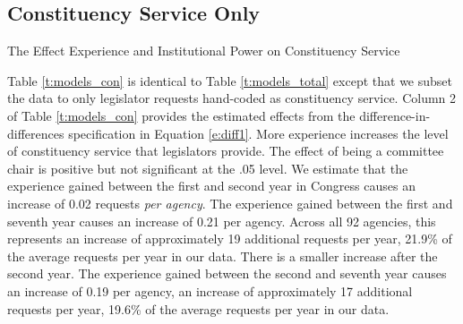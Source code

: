  




\subsection{Constituency Service Only}

\begin{table}[hbt!]
\caption{The Effect Experience and Institutional Power on Constituency Service} \label{t:models_con}
\begin{minipage}{\textwidth}
\begin{center}
\small
\end{center}
\end{minipage}
\end{table}

Table \ref{t:models_con} is identical to Table \ref{t:models_total} except that we subset the data to only legislator requests hand-coded as constituency service. 
Column 2 of Table \ref{t:models_con} provides the estimated effects from the difference-in-differences specification in Equation \ref{e:diff1}. More experience increases the level of constituency service that legislators provide. The effect of being a committee chair is positive but not significant at the .05 level. We estimate that the experience gained between the first and second year in Congress causes an increase of 0.02 requests \textit{per agency}. The experience gained between the first and seventh year causes an increase of 0.21 per agency. Across all 92 agencies, this represents an increase of approximately 19 additional requests per year, 21.9\% of the average requests per year in our data. There is a smaller increase after the second year. The experience gained between the second and seventh year causes an increase of 0.19 per agency, an increase of approximately 17 additional requests per year, 19.6\% of the average requests per year in our data.


